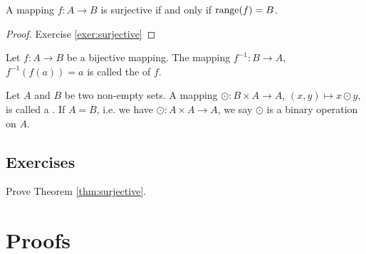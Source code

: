 \begin{thm}\label{thm:surjective}
A mapping $ f:A\to B $ is surjective if and only if $ \operatorname{range}(f)=B $.
\end{thm}
\begin{proof}
Exercise \ref{exer:surjective}\noqed
\end{proof}

\begin{defn}
Let $ f:A\to B $ be a bijective mapping. The mapping $ f^{-1}:B\to A $, $ f^{-1}(f(a))=a $ is called the  of $ f $.
\end{defn}

\begin{defn}\label{defn:binop}
Let $ A $ and $ B $ be two non-empty sets. A mapping $ \odot:B\times A\to A $, $ (x,y)\mapsto x\odot y $, is called a . If $ A=B $, i.e. we have $ \odot:A\times A\to A $, we say $ \odot $ is a binary operation on $ A $.
\end{defn}

\subsection*{Exercises}

\begin{exer}\label{exer:surjective}
Prove Theorem \ref{thm:surjective}.
\end{exer}

\section{Proofs}